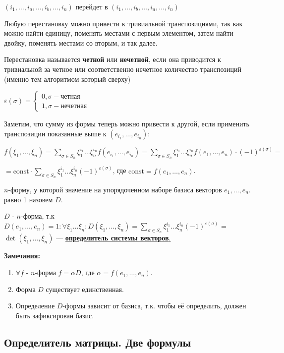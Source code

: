 \((i_1,\ldots,i_a,\ldots,i_b,\ldots,i_n)\)
перейдет в \((i_1,\ldots,i_b,\ldots,i_a,\ldots,i_n)\)

Любую перестановку можно привести к тривиальной транспозициями, так как можно найти единицу, поменять местами с первым элементом, затем найти двойку, поменять местами со вторым, и так далее.

Перестановка называется \textbf{четной} или \textbf{нечетной}, если она приводится к тривиальной за четное или соответственно нечетное количество транспозиций (именно тем алгоритмом который сверху)

\(\varepsilon(\sigma) = \begin{cases}
    0, \sigma - \text{четная} \\
    1, \sigma - \text{нечетная}
\end{cases}\)

Заметим, что сумму из формы теперь можно привести к другой, если применить транспозиции показанные выше к \((e_{i_1},\ldots,e_{i_n})\):

\(f(\xi_1,\ldots,\xi_n) =  \sum\limits_{\sigma \in S_n} \xi_1^{i_1} \ldots \xi_n^{i_n} f(e_{i_1},\ldots,e_{i_n}) = \sum\limits_{\sigma \in S_n} \xi_1^{i_1} \ldots \xi_n^{i_n} f(e_1,\ldots,e_n)\cdot (-1)^{\varepsilon(\sigma)} =\)

\(= \text{const} \cdot \sum\limits_{\sigma \in S_n} \xi_1^{i_1} \ldots \xi_n^{i_n} (-1)^{\varepsilon(\sigma)}\), где \(\text{const} = f(e_1,\ldots, e_n)\).

\(n\)-форму, у которой значение на упорядоченном наборе базиса векторов \(e_1,\ldots,e_n\). равно 1 назовем \(D\).

\(D\) - \(n\)-форма, т.к \(D(e_1,\ldots,e_n) = 1: \forall \xi_1 \ldots \xi_n: D(\xi_1,\ldots, \xi_n) = \sum\limits_{\sigma \in S_n} \xi_1^{i_1} \ldots \xi_n^{i_n} (-1)^{\varepsilon(\sigma)}\) = \(\det (\xi_1,\ldots, \xi_n)\) --- \uline{\textbf{определитель системы векторов}.}

\textbf{Замечания:}
\begin{enumerate}
    \item \(\forall f\) - \(n\)-форма  \(f = \alpha D\), где \(\alpha = f(e_1,\ldots,e_n)\).
    \item Форма \(D\) существует единственная.
    \item Определение \(D\)-формы зависит от базиса, т.к. чтобы её определить, должен быть зафиксирован базис.
\end{enumerate}

\subsection{Определитель матрицы. Две формулы}

